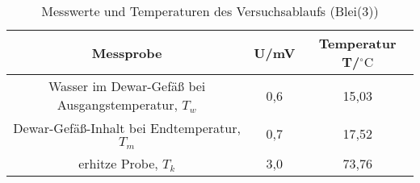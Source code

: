 \begin{table}[h]
	\begin{center}
		\begin{tabular}{ccc}
			Messprobe & U/mV & Temperatur T/$^{\circ}\mathrm{C}$\\ \hline
			Wasser im Dewar-Gefäß bei Ausgangstemperatur, $T_w$&0,6&15,03\\
			Dewar-Gefäß-Inhalt bei Endtemperatur, $T_m$&0,7&17,52\\
			erhitze Probe, $T_k$&3,0&73,76
		\end{tabular}
		\caption{Messwerte und Temperaturen des Versuchsablaufs (Blei(3))}
		\label{tabblei3}
	\end{center}
\end{table}